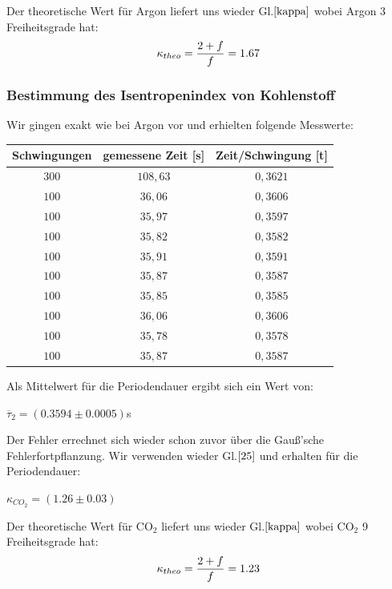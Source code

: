 \documentclass{article}
\begin{document}
{{Der theoretische Wert für Argon liefert uns wieder Gl.\(\eqref{kappa}\) wobei Argon 3 Freiheitsgrade hat:
\begin{equation}
\notag
\kappa_{theo} = \frac{2+f}{f} = 1.67
\end{equation}

\subsubsection{Bestimmung des Isentropenindex von Kohlenstoff}
Wir gingen exakt wie bei Argon vor und erhielten folgende Messwerte:
\begin{center}
\begin{tabular}{c|c|c}
Schwingungen & gemessene Zeit [s]& Zeit/Schwingung [t]\\
\hline 
\(300\)	& \(108,63\) & \(0,3621\)\\
\(100\)	& \(36,06\)	& \(0,3606\)\\
\(100\)	& \(35,97\)	& \(0,3597\)\\
\(100\)	& \(35,82\)	& \(0,3582\)\\
\(100\)	& \(35,91\)	& \(0,3591\)\\
\(100\)	& \(35,87\)	& \(0,3587\)\\
\(100\)	& \(35,85\)	& \(0,3585\)\\
\(100\)	& \(36,06\)	& \(0,3606\)\\
\(100\)	& \(35,78\)	& \(0,3578\)\\
\(100\)	& \(35,87\)	& \(0,3587\)\\
\end{tabular}
\end{center}

\vspace{1cm}

Als Mittelwert für die Periodendauer ergibt sich ein Wert von:
\begin{center}
\(\overline{\tau}_{2} = (0.3594 \pm 0.0005)\)s
\end{center}

Der Fehler errechnet sich wieder schon zuvor über die Gauß'sche Fehlerfortpflanzung.
Wir verwenden wieder Gl.\(\eqref{25}\) und erhalten für die Periodendauer:
\begin{center}
\(\kappa_{CO_2} = (1.26 \pm 0.03)\)
\end{center}

Der theoretische Wert für CO\(_2\) liefert uns wieder Gl.\(\eqref{kappa}\) wobei CO\(_2\) 9 Freiheitsgrade hat:
\begin{equation}
\notag
\kappa_{theo} = \frac{2+f}{f} = 1.23
\end{equation}

}}
\end{document}
